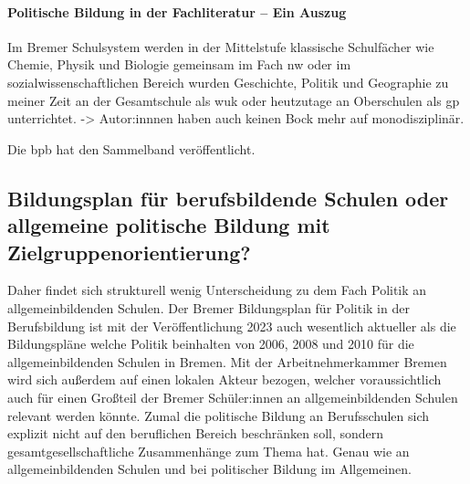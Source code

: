 
\paragraph{Politische Bildung in der Fachliteratur -- Ein Auszug}
Im Bremer Schulsystem werden in der Mittelstufe klassische Schulfächer wie Chemie, Physik und Biologie gemeinsam im Fach \gls{nw} \autocite{vogel2010nw} oder im sozialwissenschaftlichen Bereich wurden Geschichte, Politik und Geographie zu meiner Zeit an der Gesamtschule als \gls{wuk} \autocite{vogel2006gs} oder heutzutage an Oberschulen als \gls{gp} \autocite{vogel2010gp} unterrichtet.
->
Autor:innnen haben auch keinen Bock mehr auf monodisziplinär. 

Die \gls{bpb} hat den Sammelband veröffentlicht.

\subsection{Bildungsplan für berufsbildende Schulen oder allgemeine politische Bildung mit Zielgruppenorientierung?}
Daher findet sich strukturell wenig Unterscheidung zu dem Fach Politik an allgemeinbildenden Schulen.
Der Bremer Bildungsplan für Politik in der Berufsbildung ist mit der Veröffentlichung 2023 auch wesentlich aktueller als die Bildungspläne welche Politik beinhalten von 2006, 2008 und 2010 für die allgemeinbildenden Schulen in Bremen. 
Mit der Arbeitnehmerkammer Bremen wird sich außerdem auf einen lokalen Akteur bezogen, welcher voraussichtlich auch für einen Großteil der Bremer Schüler:innen an allgemeinbildenden Schulen relevant werden könnte. 
Zumal die politische Bildung an Berufsschulen sich explizit nicht auf den beruflichen Bereich beschränken soll, sondern gesamtgesellschaftliche Zusammenhänge zum Thema hat. Genau wie an allgemeinbildenden Schulen und bei politischer Bildung im Allgemeinen.


